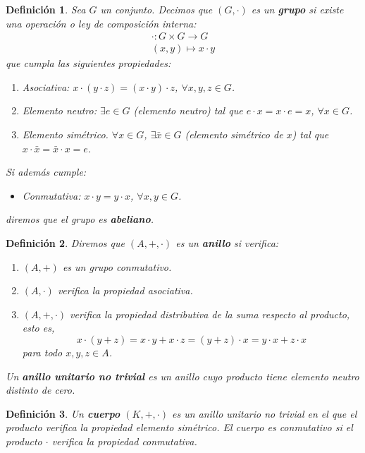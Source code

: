 \documentclass[a4paper,11pt, oneside]{book}
\newtheorem{defi}{Definición}
\begin{document}
\begin{defi}
	Sea $G$ un conjunto. Decimos que $(G,\cdot )$ es un \textbf{grupo} si existe una operación o ley de composición interna:
	\begin{equation}
	\begin{split}
	\cdot: G\times G \rightarrow G \\
	(x,y) \mapsto x\cdot y
	\end{split}
	\end{equation}
	que cumpla las siguientes propiedades:
	\begin{enumerate}
		\item Asociativa: $ x\cdot (y\cdot z) = (x\cdot y)\cdot z$, $\forall x,y,z \in G$.
		\item Elemento neutro: $\exists e \in G$ (elemento neutro) tal que $e\cdot x = x\cdot e = x$, $\forall x \in G$.
		\item Elemento simétrico. $\forall x \in G$, $\exists \bar{x} \in G$ (elemento simétrico de $x$) tal que $x\cdot \bar{x} = \bar{x}\cdot x= e$.
	\end{enumerate}
	Si además cumple:
	\begin{itemize}
		\item Conmutativa: $x\cdot y = y\cdot x$, $\forall x,y \in G$.
	\end{itemize}
	diremos que el grupo es \textbf{abeliano}.
\end{defi}
\begin{defi}
	Diremos que $(A, +,\cdot )$ es un \textbf{anillo} si verifica:
	\begin{enumerate}
	\item $(A, +)$ es un grupo conmutativo.	
	\item $(A, \cdot )$ verifica la propiedad asociativa.
	\item $(A, +, \cdot )$ verifica la propiedad distributiva de la suma respecto al producto, esto es,
	\begin{equation}
	x\cdot (y+z) = x\cdot y +x\cdot z =
	(y+z)\cdot x = y\cdot x + z\cdot x
	\end{equation}
	para todo $x,y,z \in A$.
	\end{enumerate}
	Un \textbf{anillo unitario no trivial} es un anillo cuyo producto tiene elemento neutro distinto de cero.
\end{defi}
\begin{defi}
	Un \textbf{cuerpo} $(K, +, \cdot )$ es un anillo unitario no trivial en el que el producto verifica la propiedad elemento simétrico. El cuerpo es conmutativo si el producto $\cdot $ verifica la propiedad conmutativa.
\end{defi}
\end{document}
